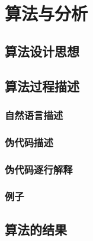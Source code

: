 \documentclass[12pt,a4paper]{article}
\begin{document}
\section{算法与分析}
\subsection{算法设计思想}
\subsection{算法过程描述}
\subsubsection{自然语言描述}
\subsubsection{伪代码描述}
\subsubsection{伪代码逐行解释}
\subsubsection{例子}
\subsection{算法的结果}
\end{document}
